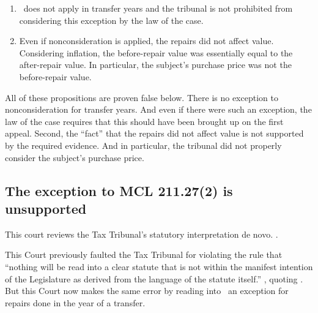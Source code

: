 \documentclass[12pt,\documentclassflag]{michiganCourtOfAppealsBrief}
\begin{document}
\begin{enumerate}
\item \mathieuGast\ does not apply in transfer years and the tribunal is not prohibited from considering this exception by the law of the case.
\item Even if nonconsideration is applied, the repairs did not affect value. Considering inflation, the before-repair value was essentially equal to the after-repair value. In particular, the subject's purchase price was not the before-repair value. 
\end{enumerate}

All of these propositions are proven false below. There is no exception to nonconsideration for transfer years. And even if there were such an exception, the law of the case requires that this should have been brought up on the first appeal. Second, the ``fact'' that the repairs did not affect value is not supported by the required evidence. And in particular, the tribunal did not properly consider the subject's purchase price. 


\subsection{The exception to MCL 211.27(2) is unsupported}

This court reviews the Tax Tribunal's statutory interpretation de novo. .

This Court previously faulted the Tax Tribunal for violating the rule that ``nothing will be read into a clear statute that is not within the manifest intention of the Legislature as derived from the language of the statute itself.'' , quoting . But this Court now makes the same error by reading into \mathieuGast\ an exception for repairs done in the year of a transfer. 

\end{document}
